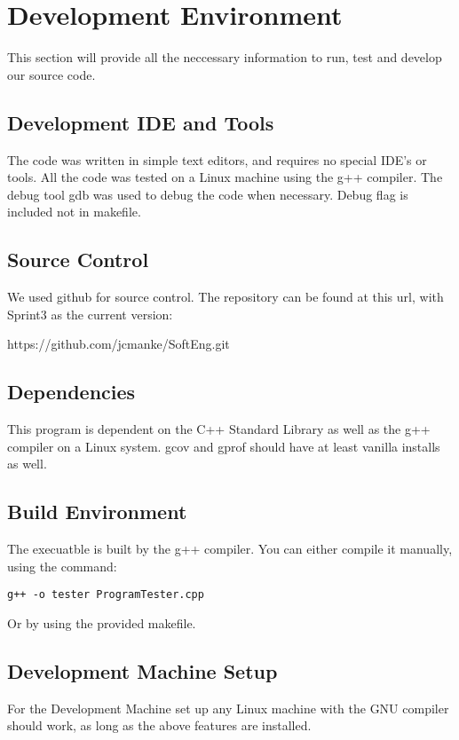 \chapter{Development Environment}
This section will provide all the neccessary information to run, test and develop 
our source code.


\section{Development IDE and Tools}
The code was written in simple text editors, and requires no special IDE's or tools.  All
the code was tested on a Linux machine using the g++ compiler.  The debug tool
gdb was used to debug the code when necessary. Debug flag is included not in makefile.

\section{Source  Control}
We used github for source control.  The repository can be found at this url, with Sprint3
as the current version: 

https://github.com/jcmanke/SoftEng.git

\section{Dependencies}
This program is dependent on the C++ Standard Library as well as the g++ compiler
on a Linux system. gcov and gprof should have at least vanilla installs as well.

\section{Build  Environment}
The execuatble is built by the g++ compiler.  You can either compile it manually, using the command:
\begin{lstlisting}
g++ -o tester ProgramTester.cpp
\end{lstlisting}
Or by using the provided makefile.

\section{Development Machine Setup}
For the Development Machine set up any Linux machine with the GNU compiler should work, as long
as the above features are installed.

